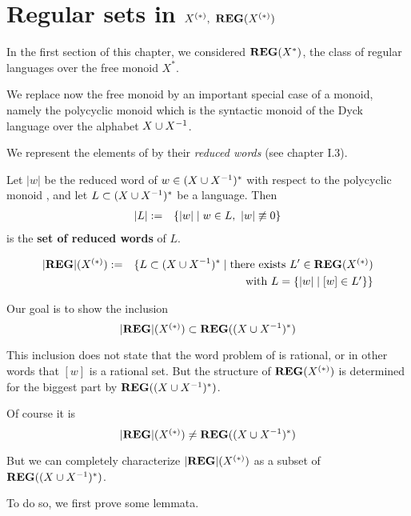 \section{Regular sets in
\texorpdfstring{$\mbox{${X}^{(*)}$},\ \mbox{{\bf REG}}(\mbox{${X}^{(*)}$})$}{X(*), REG(X(*)))}}

In the first section of this chapter, we considered $\mbox{{\bf REG}}(X^*)$, the class
of regular languages over the free monoid $X^*$.

We replace now the free monoid by an important special case of a monoid, namely
the polycyclic monoid  which is the syntactic monoid of the Dyck
language over the alphabet $X \cup {X}^{-1}$.

We represent the elements of  by their {\em reduced words} (see
chapter I.3).

\begin{definition}
Let $|w|$ be the reduced word of $w \in (X \cup {X}^{-1})^*$ with respect to the
polycyclic monoid , and let $L \subset (X \cup {X}^{-1})^*$ be a
language. Then
\begin{eqnarray*}
|L| &:=& \mbox{$\{|w| \mid w \in L,\ |w| \not\equiv 0\}$}
\end{eqnarray*}
is the {\bf set of reduced words} of $L$.
\end{definition}

\bigskip
\begin{definition}
\begin{eqnarray*}
|\mbox{{\bf REG}}|(\mbox{${X}^{(*)}$}) & := & \{ L \subset (X\cup X^{-1})^* \mid \mbox{there
exists }L' \in \mbox{{\bf REG}}(\mbox{${X}^{(*)}$}) \\
& & \mbox{ with } L = \mbox{$\{|w| \mid [w] \in L'\}$} \}
\end{eqnarray*}
\end{definition}

Our goal is to show the inclusion
\[ |\mbox{{\bf REG}}|(\mbox{${X}^{(*)}$}) \subset \mbox{{\bf REG}}((X \cup {X}^{-1})^*) \]

This inclusion does not state that the word problem of  is rational,
or in other words that $[w]$ is a rational set. But the structure of
$\mbox{{\bf REG}}(\mbox{${X}^{(*)}$})$ is determined for the biggest part by $\mbox{{\bf REG}}(
(X \cup {X}^{-1})^*)$.

Of course it is
\[ |\mbox{{\bf REG}}|(\mbox{${X}^{(*)}$}) \neq \mbox{{\bf REG}}((X \cup {X}^{-1})^*) \]

But we can completely characterize $|\mbox{{\bf REG}}|(\mbox{${X}^{(*)}$})$ as a subset of $\mbox{{\bf REG}}((X
\cup X^{-1})^*)$.

To do so, we first prove some lemmata.

